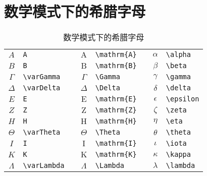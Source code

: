 \section{数学模式下的希腊字母}

\begin{table}[h]
\caption{数学模式下的希腊字母}
\begin{center}
\begin{tabular}{c p{15ex} p{5ex} c p{15ex} p{5ex} c p{15ex}}
	\hline
	$A$           & \texttt{A}                          && $\mathrm{A}$  & \texttt{\textbackslash mathrm\{A\}} && $\alpha$      & \texttt{\textbackslash alpha}       \\
	$B$           & \texttt{B}                          && $\mathrm{B}$  & \texttt{\textbackslash mathrm\{B\}} && $\beta$       & \texttt{\textbackslash beta}        \\
	$\varGamma$   & \texttt{\textbackslash varGamma}    && $\Gamma$      & \texttt{\textbackslash Gamma}       && $\gamma$      & \texttt{\textbackslash gamma}       \\
	$\varDelta$   & \texttt{\textbackslash varDelta}    && $\Delta$      & \texttt{\textbackslash Delta}       && $\delta$      & \texttt{\textbackslash delta}       \\
	$E$           & \texttt{E}                          && $\mathrm{E}$  & \texttt{\textbackslash mathrm\{E\}} && $\epsilon$    & \texttt{\textbackslash epsilon}     \\
	$Z$           & \texttt{Z}                          && $\mathrm{Z}$  & \texttt{\textbackslash mathrm\{Z\}} && $\zeta$       & \texttt{\textbackslash zeta}        \\
	$H$           & \texttt{H}                          && $\mathrm{H}$  & \texttt{\textbackslash mathrm\{H\}} && $\eta$        & \texttt{\textbackslash eta}         \\
	$\varTheta$   & \texttt{\textbackslash varTheta}    && $\Theta$      & \texttt{\textbackslash Theta}       && $\theta$      & \texttt{\textbackslash theta}       \\
	$I$           & \texttt{I}                          && $\mathrm{I}$  & \texttt{\textbackslash mathrm\{I\}} && $\iota$       & \texttt{\textbackslash iota}        \\
	$K$           & \texttt{K}                          && $\mathrm{K}$  & \texttt{\textbackslash mathrm\{K\}} && $\kappa$      & \texttt{\textbackslash kappa}       \\
	$\varLambda$  & \texttt{\textbackslash varLambda}   && $\Lambda$     & \texttt{\textbackslash Lambda}      && $\lambda$     & \texttt{\textbackslash lambda}      \\

\end{tabular}
\end{center}
\end{table}
